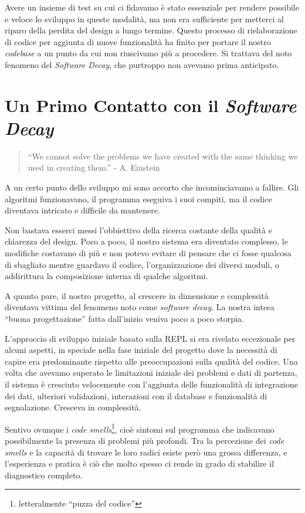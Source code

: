 \documentclass[12pt]{report}
\begin{document}
Avere un insieme di test su cui ci fidavamo è stato essenziale per
rendere possibile e veloce lo sviluppo in queste modalità, ma
non era sufficiente per metterci al riparo della perdita del
design a lungo termine. Questo processo di rielaborazione di 
codice per aggiunta di nuove funzionalità ha finito per portare 
il nostro \textit{codebase} a un punto da cui non riuscivamo più a procedere.
Si trattava del noto fenomeno del \textit{Software Decay}, che purtroppo
non avevamo prima anticipato.

% 
%
%
\chapter{Un Primo Contatto con il \textit{Software Decay}}

\begin{quote}
``We cannot solve the problems we have created
with the same thinking we used in creating them.'' - A. Einstein
\end{quote}

A un certo punto dello sviluppo mi sono accorto che incominciavamo a fallire. 
Gli algoritmi funzionavano, il programma eseguiva i suoi compiti, ma il
codice diventava intricato e difficile da mantenere.

Non bastava esserci messi l'obbiettivo della ricerca costante della qualità e 
chiarezza del design. Poco a poco, il nostro sistema era diventato complesso, 
le modifiche costavano di più e non potevo evitare di pensare che ci fosse 
qualcosa di sbagliato mentre guardavo il codice, l'organizzazione dei diversi 
moduli, o addirittura la composizione interna di qualche algoritmi. 

A quanto pare, il nostro progetto, al crescere in dimensione e complessità 
diventava vittima del fenomeno noto come \textit{software decay}.
La nostra intesa ``buona progettazione'' fatta 
dall'inizio veniva poco a poco storpia.

L'approccio di sviluppo iniziale basato sulla REPL si era rivelato eccezionale 
per alcuni aspetti, in speciale nella fase iniziale del progetto dove la 
necessità di capire era predominante rispetto alle preoccupazioni sulla 
qualità del codice. Una volta che avevamo superato le limitazioni iniziale dei 
problemi e dati di partenza, il sistema è cresciuto velocemente con l'aggiunta 
delle funzionalità di integrazione dei dati, ulteriori validazioni, interazioni 
con il database e funzionalità di segnalazione. Cresceva in complessità. 

Sentivo ovunque i \textit{code smells}\footnote{
letteralmente ``puzza del codice''}, cioè sintomi sul programma che indicavano 
possibilmente la presenza di problemi più profondi. Tra la percezione dei 
\textit{code smells} e la capacità di trovare le loro radici esiste però una
grossa differenza, e l'esperienza e pratica è ciò che molto spesso ci rende
in grado di stabilire il diagnostico completo.
\end{document}
